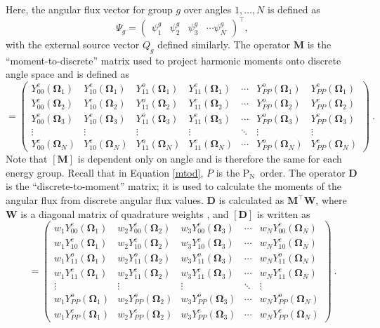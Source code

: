 \documentclass{article} %
\newcommand{\bo}{\mathbf\Omega}
\newcommand{\pn}{P$_\mathrm{N}$}
\newcommand{\ve}[1]{\ensuremath{\mathbf{#1}}}
\newcommand{\Ye}[2]{\ensuremath{Y^e_{#1}(\bo_#2)}}
\newcommand{\Yo}[2]{\ensuremath{Y^o_{#1}(\bo_#2)}}
\begin{document}
Here, the angular flux vector for group $g$ over angles $1,\ldots,N$ is defined
as
%
\begin{equation}
  \Psi_g = \begin{pmatrix}
    \psi^g_1 & \psi^g_2 & \psi^g_3 & \cdots \psi^g_N
  \end{pmatrix}^\top,
\label{psiv}
\end{equation}
%
with the external source vector $Q_g$ defined similarly. The operator
$\ve{M}$ is the ``moment-to-discrete'' matrix
used to project harmonic moments onto discrete angle space and is defined as
%
\begin{equation}
[\ve{M}] = \begin{pmatrix}
\Ye{00}{1} & \Ye{10}{1} & \Yo{11}{1} & \Ye{11}{1} & \cdots & \Yo{PP}{1} & \Ye{PP}{1} \\
\Ye{00}{2} & \Ye{10}{2} & \Yo{11}{2} & \Ye{11}{2} & \cdots & \Yo{PP}{2} & \Ye{PP}{2} \\
\Ye{00}{3} & \Ye{10}{3} & \Yo{11}{3} & \Ye{11}{3} & \cdots & \Yo{PP}{3} & \Ye{PP}{3} \\
\vdots     & \vdots     & \vdots     & \vdots     & \ddots & \vdots     & \vdots     \\
\Ye{00}{N} & \Ye{10}{N} & \Yo{11}{N} & \Ye{11}{N} & \cdots & \Yo{PP}{N} & \Ye{PP}{N}
  \end{pmatrix}\:.
\label{mtod}
\end{equation}
%
Note that $[\ve{M}]$ is dependent only on angle and is therefore the
same for each energy group. Recall that in Equation \eqref{mtod}, $P$ is the \pn\
order. The operator $\ve{D}$ is the ``discrete-to-moment''
matrix; it is used to calculate the moments of the angular flux from discrete
angular flux values. $\ve{D}$ is calculated as $\ve{M}^\top\ve{W}$, where
$\ve{W}$ is a diagonal matrix of quadrature weights \cite{exmm}, and $[\ve{D}]$ is
written as
%
\begin{equation}
  [\ve{D}] = \begin{pmatrix}
    w_1\Ye{00}{1} & w_2\Ye{00}{2} & w_3\Ye{00}{3} & \cdots & w_N\Ye{00}{N} \\ 
    w_1\Ye{10}{1} & w_2\Ye{10}{2} & w_3\Ye{10}{3} & \cdots & w_N\Ye{10}{N} \\
    w_1\Yo{11}{1} & w_2\Yo{11}{2} & w_3\Yo{11}{3} & \cdots & w_N\Yo{11}{N} \\
    w_1\Ye{11}{1} & w_2\Ye{11}{2} & w_3\Ye{11}{3} & \cdots & w_N\Ye{11}{N} \\
    \vdots        & \vdots        & \vdots        & \ddots & \vdots        \\
    w_1\Yo{PP}{1} & w_2\Yo{PP}{2} & w_3\Yo{PP}{3} & \cdots & w_N\Yo{PP}{N} \\
    w_1\Ye{PP}{1} & w_2\Ye{PP}{2} & w_3\Ye{PP}{3} & \cdots & w_N\Ye{PP}{N}
  \end{pmatrix}\:.
\end{equation}
\end{document}
